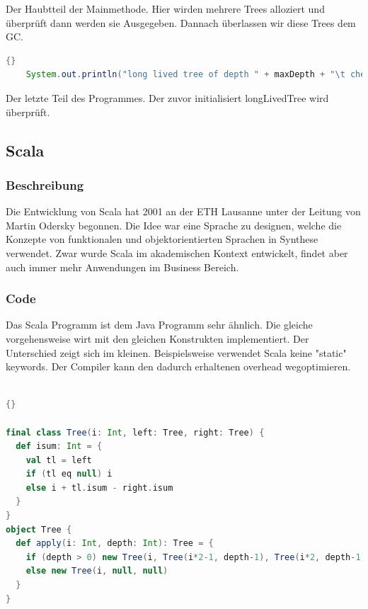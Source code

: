 \documentclass{fancydocument}
\begin{document}
Der Haubtteil der Mainmethode. Hier wirden mehrere Trees alloziert und
\"uberpr\"uft dann werden sie Ausgegeben. Dannach \"uberlassen wir
diese Trees dem GC. 

\begin{lstlisting}[language=java,caption=Long-Lived-Tree Check]{}
	System.out.println("long lived tree of depth " + maxDepth + "\t check: "+ longLivedTree.itemCheck());
\end{lstlisting}
Der letzte Teil des Programmes. Der zuvor initialisiert longLivedTree
wird \"uberpr\"uft.

\subsection{Scala}

\subsubsection{Beschreibung}

Die Entwicklung von Scala hat 2001 an der ETH Lausanne unter der Leitung von Martin
Odersky begonnen. Die Idee war eine Sprache zu designen, welche die
Konzepte von funktionalen und objektorientierten Sprachen in Synthese
verwendet. Zwar wurde Scala im akademischen Kontext entwickelt, findet
aber auch immer mehr Anwendungen im Business Bereich.

\subsubsection{Code}


Das Scala Programm ist dem Java Programm sehr \"ahnlich. Die gleiche
vorgehensweise wirt mit den gleichen Konstrukten implementiert. Der
Unterschied zeigt sich im kleinen. Beispielsweise verwendet Scala
keine "static" keywords. Der Compiler kann den dadurch erhaltenen
overhead wegoptimieren.
\\\\

\begin{lstlisting}[language=scala,caption=Scala TreeNode]{}

final class Tree(i: Int, left: Tree, right: Tree) {
  def isum: Int = {
    val tl = left
    if (tl eq null) i
    else i + tl.isum - right.isum
  }
}
object Tree {
  def apply(i: Int, depth: Int): Tree = {
    if (depth > 0) new Tree(i, Tree(i*2-1, depth-1), Tree(i*2, depth-1))
    else new Tree(i, null, null)
  }
}
\end{lstlisting}
\end{document}
